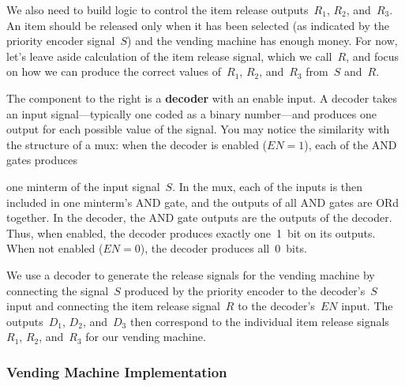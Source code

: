 \begin{minipage}{3.2in}
We also need to build logic to control the item release outputs~$R_1$, $R_2$,
and~$R_3$.  An item should be released only when it has been selected 
(as indicated by the priority encoder signal~$S$) and the vending machine
has enough money.  For now, let's leave aside calculation of the item 
release signal, which we call~$R$, and focus on how we can produce the
correct values of~$R_1$, $R_2$, and~$R_3$ from~$S$ and~$R$.\mpline

The component to the right is a {\bf decoder} with an enable input.  A 
decoder takes an input signal---typically one coded as a binary number---and 
produces one output for each possible value of the signal.  You may
notice the similarity with the structure of a mux: when the decoder
is enabled ($EN=1$), each of the AND gates produces\linebreak
\end{minipage}\hspace{0.25in}%
\begin{minipage}{3.05in}
\vspace{12pt}
\end{minipage}\mpdone

one minterm of the input signal~$S$.  In
the mux, each of the inputs is then included in
one minterm's AND gate, and the outputs of all AND gates are ORd together.
In the decoder, the AND gate outputs are the outputs of the decoder.
Thus, when enabled, the decoder produces exactly one~1~bit on its outputs.
When not enabled ($EN=0$), the decoder produces all~0~bits.

We use a decoder to generate the release signals for the vending machine
by connecting the signal~$S$ produced by the 
priority encoder to the decoder's~$S$ input and connecting the item
release signal~$R$ to the decoder's~$EN$ input.  The outputs~$D_1$,
$D_2$, and~$D_3$ then correspond to the individual item release 
signals~$R_1$, $R_2$, and~$R_3$ for our vending machine.

\subsubsection{Vending Machine Implementation}

